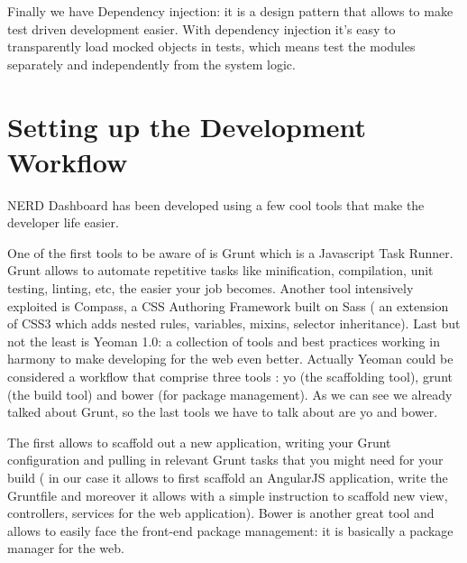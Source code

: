 \documentclass[a4paper,13pt]{report}
\begin{document}
Finally we have Dependency injection: it is a design pattern that allows to make test driven development easier. With dependency injection it's easy to transparently load mocked objects in tests, which means test the modules separately and independently from the system logic.

 \section{Setting up the Development Workflow}
 NERD Dashboard has been developed using a few cool tools that make the developer life easier. 

One of the first tools to be aware of is Grunt which is a Javascript Task Runner. Grunt allows to automate repetitive tasks like minification, compilation, unit testing, linting, etc, the easier your job becomes.\newline
Another tool intensively exploited is Compass, a CSS Authoring Framework built on Sass ( an extension of CSS3 which adds nested rules, variables, mixins, selector inheritance).
Last but not the least is Yeoman 1.0: a collection of tools and best practices working in harmony to make developing for the web even better. Actually Yeoman could be considered a workflow that comprise three tools : yo (the scaffolding tool), grunt (the build tool) and bower (for package management). As we can see we already talked about Grunt, so the last tools we have to talk about are yo and bower.

The first allows to scaffold out a new application, writing your Grunt configuration and pulling in relevant Grunt tasks that you might need for your build ( in our case  it allows to first scaffold an AngularJS application, write the Gruntfile and moreover it allows with a simple instruction to scaffold new view, controllers, services for the web application). Bower is another great tool and allows to easily face the front-end package management: it is basically a package manager for the web.
\end{document}
